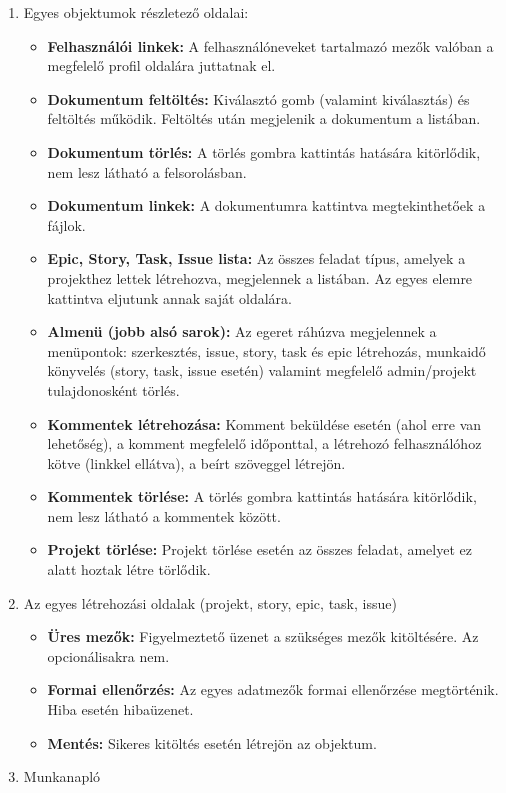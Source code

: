 \begin{enumerate}
	\item Egyes objektumok részletező oldalai:
	\begin{itemize}
		\item \textbf{Felhasználói linkek:} A felhasználóneveket tartalmazó mezők valóban a megfelelő profil oldalára juttatnak el.
		\item \textbf{Dokumentum feltöltés:} Kiválasztó gomb (valamint kiválasztás) és feltöltés működik. Feltöltés után megjelenik a dokumentum a listában.
		\item \textbf{Dokumentum törlés:} A törlés gombra kattintás hatására kitörlődik, nem lesz látható a felsorolásban.
		\item \textbf{Dokumentum linkek:} A dokumentumra kattintva megtekinthetőek a fájlok.
		\item \textbf{Epic, Story, Task, Issue lista:} Az összes feladat típus, amelyek a projekthez lettek létrehozva, megjelennek a listában. Az egyes elemre kattintva eljutunk annak saját oldalára.
		\item \textbf{Almenü (jobb alsó sarok):} Az egeret ráhúzva megjelennek a menüpontok: szerkesztés, issue, story, task és epic létrehozás, munkaidő könyvelés (story, task, issue esetén) valamint megfelelő admin/projekt tulajdonosként törlés.
		\item \textbf{Kommentek létrehozása:} Komment beküldése esetén (ahol erre van lehetőség), a komment megfelelő időponttal, a létrehozó felhasználóhoz kötve (linkkel ellátva), a beírt szöveggel létrejön.
		\item \textbf{Kommentek törlése:} A törlés gombra kattintás hatására kitörlődik, nem lesz látható a kommentek között.
		\item \textbf{Projekt törlése:} Projekt törlése esetén az összes feladat, amelyet ez alatt hoztak létre törlődik.
	\end{itemize} 
	\item Az egyes létrehozási oldalak (projekt, story, epic, task, issue)
	\begin{itemize}
		\item \textbf{Üres mezők:} Figyelmeztető üzenet a szükséges mezők kitöltésére. Az opcionálisakra nem.
		\item \textbf{Formai ellenőrzés:} Az egyes adatmezők formai ellenőrzése megtörténik. Hiba esetén hibaüzenet.
		\item \textbf{Mentés:} Sikeres kitöltés esetén létrejön az objektum.
	\end{itemize}
	\item Munkanapló

\end{enumerate}

